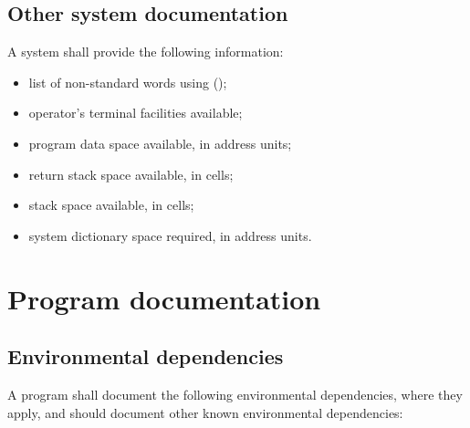 \subsection{Other system documentation} %

A system shall provide the following information:

\begin{itemize}

\item list of non-standard words using 
	();

\item operator's terminal facilities available;

\item program data space available, in address units;

\item return stack space available, in cells;

\item stack space available, in cells;

\item system dictionary space required, in address units.
\end{itemize}



\section{Program documentation} %
\label{doc:program}

\subsection{Environmental dependencies} %

A program shall document the following environmental dependencies,
where they apply, and should document other known environmental
dependencies:

